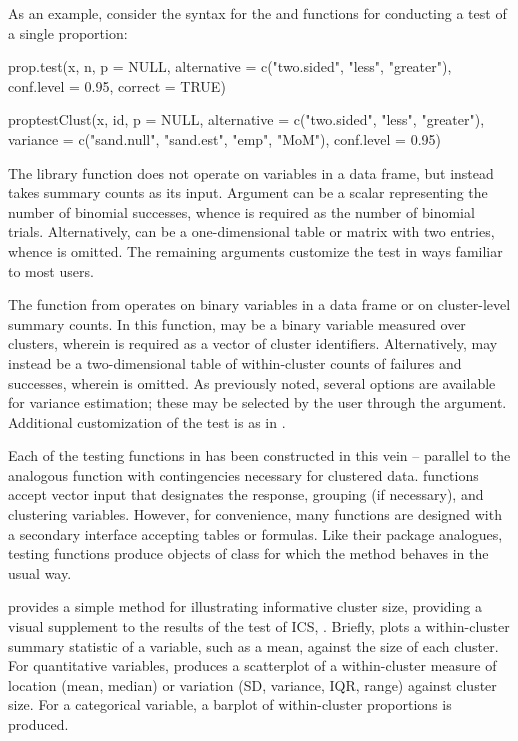 As an example, consider the syntax for the  and  functions for conducting a test of a single proportion:
\begin{example}	
	prop.test(x, n, p = NULL, alternative = c("two.sided", "less", "greater"),
	conf.level = 0.95, correct = TRUE)
	
	proptestClust(x, id, p = NULL, alternative = c("two.sided", "less",
	"greater"), variance = c("sand.null", "sand.est", "emp", "MoM"),
	conf.level = 0.95)
\end{example}
The  library function  does not operate on variables in a data frame, but instead takes summary counts as its input. Argument  can be a scalar representing the number of binomial successes, whence  is required as the number of binomial trials. Alternatively,  can be a one-dimensional table or matrix with two entries, whence  is omitted. The remaining arguments customize the test in ways familiar to most users.

The function  from  operates on binary variables in a data frame or on cluster-level summary counts. In this function,  may be a binary variable measured over clusters, wherein  is required as a vector of cluster identifiers. Alternatively,  may instead be a two-dimensional table of within-cluster counts of failures and successes, wherein  is omitted. As previously noted, several options are available for variance estimation; these may be selected by the user through the  argument. Additional customization of the test is as in .

Each of the testing functions in  has been constructed in this vein -- parallel to the analogous  function with contingencies necessary for clustered data.  functions accept vector input that designates the response, grouping (if necessary), and clustering variables. However, for convenience, many functions are designed with a secondary interface accepting tables or formulas. Like their  package analogues,  testing functions produce  objects of class  for which the  method behaves in the usual way.

 provides a simple method for illustrating informative cluster size, providing a visual supplement to the results of the test of ICS, . Briefly,  plots a within-cluster summary statistic of a variable, such as a mean, against the size of each cluster. For quantitative variables,  produces a scatterplot of a within-cluster measure of location (mean, median) or variation (SD, variance, IQR, range) against cluster size. For a categorical variable, a barplot of within-cluster proportions is produced.
